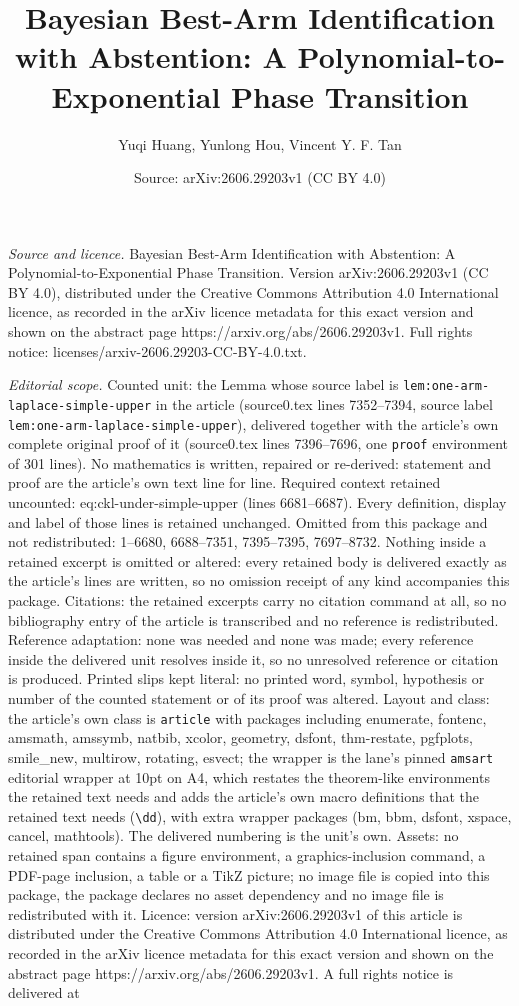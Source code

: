 \documentclass[10pt,a4paper]{amsart}
\title[Bayesian Best-Arm Identification with Abstention: A Polynomi]{Bayesian Best-Arm Identification with Abstention: A Polynomial-to-Exponential Phase Transition}
\author{Yuqi Huang, Yunlong Hou, Vincent Y. F. Tan}
\date{Source: arXiv:2606.29203v1 (CC BY 4.0)}
\begin{document}
\maketitle

\noindent\emph{Source and licence.} Bayesian Best-Arm Identification with Abstention: A Polynomial-to-Exponential Phase Transition. Version arXiv:2606.29203v1 (CC BY 4.0), distributed under the Creative Commons Attribution 4.0 International licence, as recorded in the arXiv licence metadata for this exact version and shown on the abstract page https://arxiv.org/abs/2606.29203v1. Full rights notice: licenses/arxiv-2606.29203-CC-BY-4.0.txt.\par\smallskip

\noindent\textit{Editorial scope.} Counted unit: the Lemma whose source label is \texttt{lem:one-arm-laplace-simple-upper} in the article (source0.tex lines 7352--7394, source label \texttt{lem:one-arm-laplace-simple-upper}), delivered together with the article's own complete original proof of it (source0.tex lines 7396--7696, one \texttt{proof} environment of 301 lines). No mathematics is written, repaired or re-derived: statement and proof are the article's own text line for line. Required context retained uncounted: eq:ckl-under-simple-upper (lines 6681--6687). Every definition, display and label of those lines is retained unchanged. Omitted from this package and not redistributed: 1--6680, 6688--7351, 7395--7395, 7697--8732. Nothing inside a retained excerpt is omitted or altered: every retained body is delivered exactly as the article's lines are written, so no omission receipt of any kind accompanies this package. Citations: the retained excerpts carry no citation command at all, so no bibliography entry of the article is transcribed and no reference is redistributed. Reference adaptation: none was needed and none was made; every reference inside the delivered unit resolves inside it, so no unresolved reference or citation is produced. Printed slips kept literal: no printed word, symbol, hypothesis or number of the counted statement or of its proof was altered. Layout and class: the article's own class is \texttt{article} with packages including enumerate, fontenc, amsmath, amssymb, natbib, xcolor, geometry, dsfont, thm-restate, pgfplots, smile\_new, multirow, rotating, esvect; the wrapper is the lane's pinned \texttt{amsart} editorial wrapper at 10pt on A4, which restates the theorem-like environments the retained text needs and adds the article's own macro definitions that the retained text needs (\texttt{\textbackslash dd}), with extra wrapper packages (bm, bbm, dsfont, xspace, cancel, mathtools). The delivered numbering is the unit's own. Assets: no retained span contains a figure environment, a graphics-inclusion command, a PDF-page inclusion, a table or a TikZ picture; no image file is copied into this package, the package declares no asset dependency and no image file is redistributed with it. Licence: version arXiv:2606.29203v1 of this article is distributed under the Creative Commons Attribution 4.0 International licence, as recorded in the arXiv licence metadata for this exact version and shown on the abstract page https://arxiv.org/abs/2606.29203v1. A full rights notice is delivered at 
\end{document}
